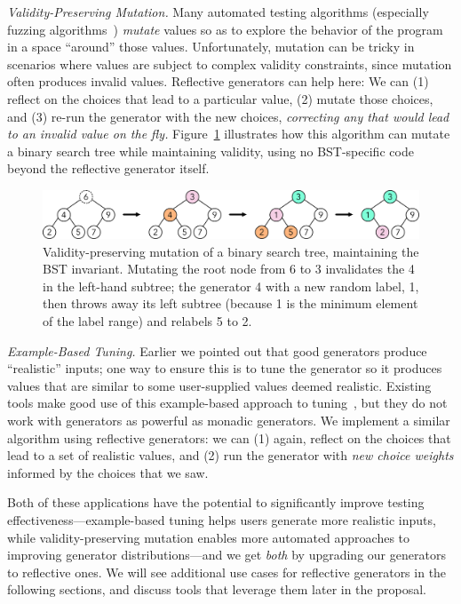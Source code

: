 {\em Validity-Preserving Mutation.}
Many automated testing algorithms
(especially fuzzing algorithms~\cite{afl-readme}) {\em mutate} values
so as to explore
the behavior of the program in a space ``around'' those
values. Unfortunately, mutation can be
tricky in scenarios where values are subject to complex validity
constraints, since mutation often produces invalid values. Reflective
generators can help here: We can (1) reflect on the choices that lead
to a particular
value, (2) mutate those choices, and (3) re-run the generator with the new
choices, {\em correcting any that
would lead to an invalid value on the fly.} Figure~\ref{fig:mutation}
illustrates how this
algorithm can mutate a binary search tree while maintaining validity,
using no BST-specific code beyond the reflective generator itself.
\begin{figure}[t]
  \centering
  \includegraphics[width=.6\textwidth]{assets/mutate-diagram.pdf}
  \vspace{-2mm}
  \caption{Validity-preserving mutation of a binary search tree, maintaining the
  BST invariant. Mutating the root node from 6 to 3 invalidates the
  4 in the left-hand subtree; the generator 4 with a new random label,
1, then throws away its left subtree (because 1 is the
minimum element of the label range) and relabels 5 to 2.}\label{fig:mutation}
\end{figure}

\medskip

{\em Example-Based Tuning.} Earlier we pointed out that good generators
produce ``realistic'' inputs; one way to ensure this is to tune the generator so
it produces values that are similar to some user-supplied values deemed
realistic. Existing tools make good use of this example-based approach to
tuning~\cite{soremekun2020inputs}, but they do not work with generators as
powerful as monadic generators. We implement a similar algorithm using
reflective generators: we can (1) again, reflect on the choices that lead to a
set of realistic values, and (2) run the generator with {\em new choice weights}
informed by the choices that we saw.

Both of these applications have the potential to significantly improve
testing effectiveness---example-based tuning helps users generate more
realistic inputs, while validity-preserving mutation enables more
automated approaches to improving generator distributions---and we get
{\em both} by upgrading our generators to reflective ones. We
will see additional use cases for reflective generators in the
following sections, and discuss tools that leverage them later in the proposal.

